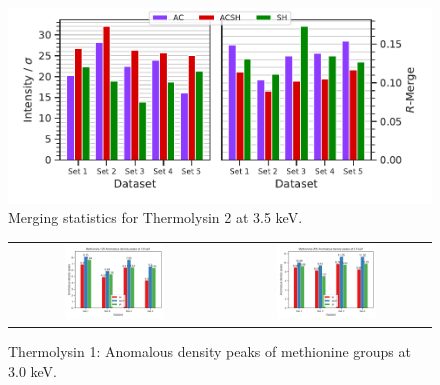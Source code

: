 \begin{figure}
    \centering
    \includegraphics{plots/exp1/tlys_2_P6122/3p5_stats_grid.pdf}
    \caption{Merging statistics for Thermolysin 2 at 3.5 \unit{keV}.}
    \label{fig:tlys_2_3p5}
\end{figure}


\begin{figure}
    \centering
    \begin{tabular}{cc}
        \includegraphics[width = 0.5\textwidth]{plots/exp1/tlys_9_P6122/peaks/3p0_met120_peaks.png} & \includegraphics[width = 0.5\textwidth]{plots/exp1/tlys_9_P6122/peaks/3p0_met205_peaks.png}
    \end{tabular}
    \caption{Thermolysin 1: Anomalous density peaks of methionine groups at 3.0 \unit{keV}.}
    \label{fig:tlys9_met_peaks_3p0}
\end{figure}


